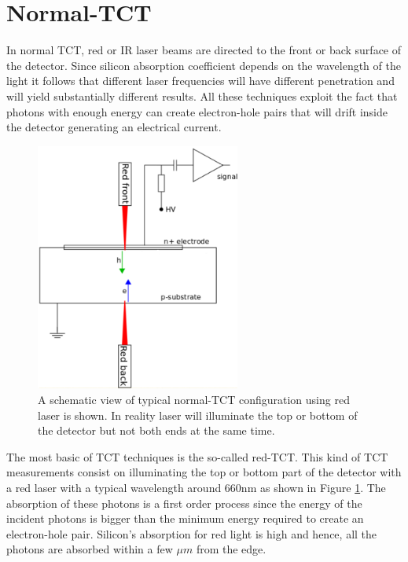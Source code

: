 \section{Normal-TCT} %
\label{sec:redTCT}

In normal TCT, red or IR laser beams are directed to the front or back surface of the detector. Since silicon absorption coefficient depends on the wavelength of the light it follows that different laser frequencies will have different penetration and will yield substantially different results. All these techniques exploit the fact that photons with enough energy can create electron-hole pairs that will drift inside the detector generating an electrical current. 

\begin{figure}[H]
	\centering
	\includegraphics[width=0.6\textwidth]{chap4_redTCT.png}
	\caption{A schematic view of typical normal-TCT configuration using red laser is shown. In reality laser will illuminate the top or bottom of the detector but not both ends at the same time.}
	\label{fig:redTCT}
\end{figure}

The most basic of TCT techniques is the so-called red-TCT. This kind of TCT measurements consist on illuminating the top or bottom part of the detector with a red laser with a typical wavelength around 660nm as shown in Figure \ref{fig:redTCT}. The absorption of these photons is a first order process since the energy of the incident photons is bigger than the minimum energy required to create an electron-hole pair. Silicon's absorption for red light is high and hence, all the photons are absorbed within a few $\mu m$ from the edge. 

